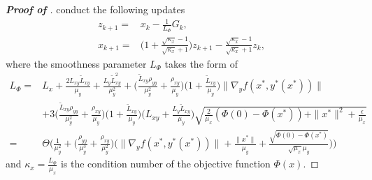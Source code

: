 \documentclass{osudissert96}
\begin{document}
\begin{proof}[{\bf Proof of }]
  conduct the following updates 
\begin{align}\label{updateRule}
z_{k+1}=&x_k -\frac{1}{L_\Phi} G_k, \nonumber
\\x_{k+1}=&\Big(1+\frac{\sqrt{\kappa_x}-1}{\sqrt{\kappa_x}+1}\Big)z_{k+1} - \frac{\sqrt{\kappa_x}-1}{\sqrt{\kappa_x}+1} z_k,
\end{align}
where the smoothness parameter $L_{\Phi}$ takes the form of 
{\small\begin{align}\label{wodishenamxd}
 L_{\Phi} =& L_x+\frac{2L_{xy}\widetilde L_{xy}}{\mu_y} + \frac{L_y\widetilde L^2_{xy}}{\mu_y^2}  +\Big(\frac{\widetilde L_{xy} \rho_{yy}}{\mu_y^2} +  \frac{\rho_{xy}}{\mu_y}\Big) \Big( 1+\frac{\widetilde L_{xy}}{\mu_y}  \Big)\|\nabla_y f( x^*,y^*(x^*))\|\nonumber
 \\&+3\Big(\frac{\widetilde L_{xy} \rho_{yy}}{\mu_y^2} +  \frac{\rho_{xy}}{\mu_y}\Big) \Big( 1+\frac{\widetilde L_{xy}}{\mu_y}  \Big)\Big(L_{xy}+\frac{L_y\widetilde L_{xy}}{\mu_y}\Big)\sqrt{\frac{2}{\mu_x}(\Phi(0) -\Phi(x^*))+ \|x^*\|^2+\frac{\epsilon}{\mu_x}} \nonumber
 \\= &\Theta\Big(\frac{1}{\mu_y^2}+\Big(\frac{ \rho_{yy}}{\mu_y^3} +  \frac{\rho_{xy}}{\mu_y^2}\Big)\Big(\|\nabla_y f( x^*,y^*(x^*))\|+\frac{\|x^*\|}{\mu_y}+\frac{\sqrt{\Phi(0)-\Phi(x^*)}}{\sqrt{\mu_x}\mu_y}\Big)  \Big)
\end{align}}
\hspace{-0.15cm}and  
$\kappa_x = \frac{L_\Phi}{\mu_x}$ is the condition number of the objective function $\Phi(x)$. 


\end{proof}
\end{document}
